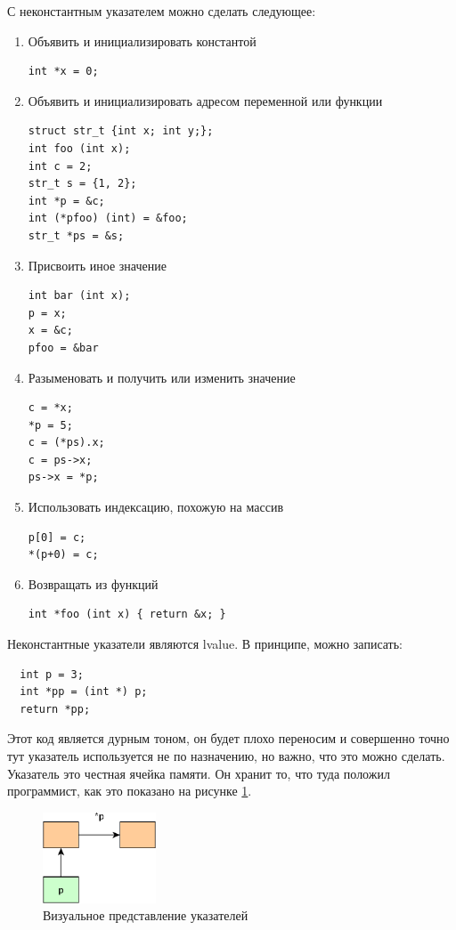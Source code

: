 \documentclass[a4paper,12pt,oneside]{article}
\begin{document}
С неконстантным указателем можно сделать следующее:

\begin{enumerate}
\item Объявить и инициализировать константой
\begin{lstlisting}
int *x = 0;
\end{lstlisting}
\item Объявить и инициализировать адресом переменной или функции
\begin{lstlisting}
struct str_t {int x; int y;};
int foo (int x);
int c = 2;
str_t s = {1, 2};
int *p = &c;
int (*pfoo) (int) = &foo;
str_t *ps = &s;
\end{lstlisting}
\item Присвоить иное значение
\begin{lstlisting}
int bar (int x);
p = x;
x = &c;
pfoo = &bar
\end{lstlisting}
\item Разыменовать и получить или изменить значение
\begin{lstlisting}
c = *x;
*p = 5;
c = (*ps).x;
c = ps->x;
ps->x = *p;
\end{lstlisting}
\item Использовать индексацию, похожую на массив
\begin{lstlisting}
p[0] = c;
*(p+0) = c;
\end{lstlisting}
\item Возвращать из функций
\begin{lstlisting}
int *foo (int x) { return &x; }
\end{lstlisting}
\end{enumerate}

Неконстантные указатели являются lvalue. В принципе, можно записать:

\begin{lstlisting}
  int p = 3;
  int *pp = (int *) p;
  return *pp;
\end{lstlisting}

Этот код является дурным тоном, он будет плохо переносим и совершенно точно тут указатель используется не по назначению, но важно, что это можно сделать. Указатель это честная ячейка памяти. Он хранит то, что туда положил программист, как это показано на рисунке \ref{fig:pointers}.

\begin{figure}[h!]
\centering
\includegraphics[width=0.3\textwidth]{illustrations/pointers-crop.pdf}
\caption{Визуальное представление указателей}
\label{fig:pointers}
\end{figure}
\end{document}
